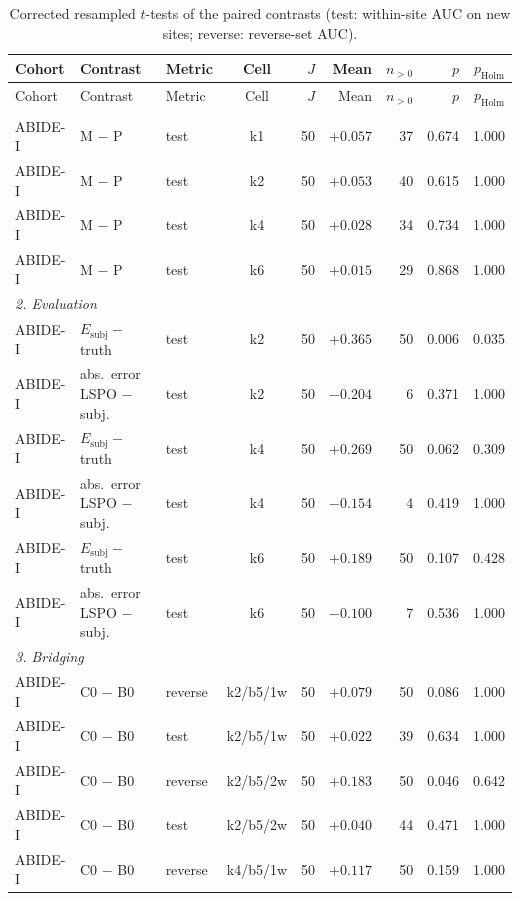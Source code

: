 \begin{longtable}{lllcrrrrr}
\caption{Corrected resampled $t$-tests of the paired contrasts (test: within-site AUC on new sites; reverse: reverse-set AUC).}\label{tab:tests}\\
\toprule
Cohort & Contrast & Metric & Cell & $J$ & Mean & $n_{>0}$ & $p$ & $p_{\mathrm{Holm}}$\\
\midrule
\endfirsthead
\toprule
Cohort & Contrast & Metric & Cell & $J$ & Mean & $n_{>0}$ & $p$ & $p_{\mathrm{Holm}}$\\
\midrule
\endhead
\bottomrule
\endfoot
\multicolumn{9}{l}{\textit{1. Cost of class purity}}\\
ABIDE-I & M $-$ P & test & k1 & 50 & $+0.057$ & 37 & 0.674 & 1.000\\
ABIDE-I & M $-$ P & test & k2 & 50 & $+0.053$ & 40 & 0.615 & 1.000\\
ABIDE-I & M $-$ P & test & k4 & 50 & $+0.028$ & 34 & 0.734 & 1.000\\
ABIDE-I & M $-$ P & test & k6 & 50 & $+0.015$ & 29 & 0.868 & 1.000\\
\multicolumn{9}{l}{\textit{2. Evaluation}}\\
ABIDE-I & $E_{\mathrm{subj}}-$ truth & test & k2 & 50 & $+0.365$ & 50 & 0.006 & 0.035\\
ABIDE-I & abs.\ error LSPO $-$ subj. & test & k2 & 50 & $-0.204$ & 6 & 0.371 & 1.000\\
ABIDE-I & $E_{\mathrm{subj}}-$ truth & test & k4 & 50 & $+0.269$ & 50 & 0.062 & 0.309\\
ABIDE-I & abs.\ error LSPO $-$ subj. & test & k4 & 50 & $-0.154$ & 4 & 0.419 & 1.000\\
ABIDE-I & $E_{\mathrm{subj}}-$ truth & test & k6 & 50 & $+0.189$ & 50 & 0.107 & 0.428\\
ABIDE-I & abs.\ error LSPO $-$ subj. & test & k6 & 50 & $-0.100$ & 7 & 0.536 & 1.000\\
\multicolumn{9}{l}{\textit{3. Bridging}}\\
ABIDE-I & C0 $-$ B0 & reverse & k2/b5/1w & 50 & $+0.079$ & 50 & 0.086 & 1.000\\
ABIDE-I & C0 $-$ B0 & test & k2/b5/1w & 50 & $+0.022$ & 39 & 0.634 & 1.000\\
ABIDE-I & C0 $-$ B0 & reverse & k2/b5/2w & 50 & $+0.183$ & 50 & 0.046 & 0.642\\
ABIDE-I & C0 $-$ B0 & test & k2/b5/2w & 50 & $+0.040$ & 44 & 0.471 & 1.000\\
ABIDE-I & C0 $-$ B0 & reverse & k4/b5/1w & 50 & $+0.117$ & 50 & 0.159 & 1.000\\

\end{longtable}
